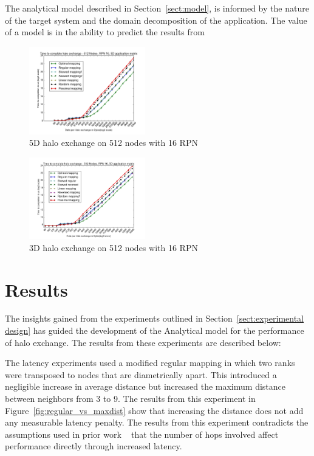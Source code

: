\documentclass{acm_proc_article-sp}
\begin{document}
The analytical model described in Section~\ref{sect:model}, is informed by the nature of the target system
and the domain decomposition of the application. The value of a model is in the ability to predict the
results from
%

\begin{figure}
  \center
  \includegraphics[width=0.45\textwidth]{5D_512_all_mappings.png}
  \caption{5D halo exchange on 512 nodes with 16 RPN}
    \label{fig:5D halo exchange on 512 nodes with 16 RPN}
\end{figure}


\begin{figure}
  \center
  \includegraphics[width=0.45\textwidth]{3D_512_all_mappings.png}
  \caption{3D halo exchange on 512 nodes with 16 RPN}
    \label{fig:3D halo exchange on 512 nodes with 16 RPN}
\end{figure}


\section{Results}

The insights gained from the experiments outlined in Section~\ref{sect:experimental design}
has guided the development of the Analytical model for the performance of halo exchange.
The results from these experiments are described below:

The latency experiments used a modified regular mapping in which two ranks were transposed to
nodes that are diametrically apart. This introduced a negligible increase in average distance but
increased the maximum distance between neighbors from 3 to 9. The results from this experiment
in Figure~\ref{fig:regular_vs_maxdist} show that increasing the distance does not add any measurable
latency penalty. The results from this experiment contradicts the assumptions used in prior work ~\cite{Bhanot_2005}
that the number of hops involved affect performance directly through increased latency.
\end{document}
